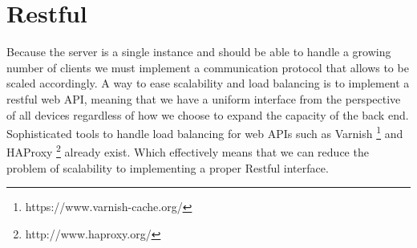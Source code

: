 
\section{Restful}
Because the server is a single instance and should be able to handle a growing number of clients we must implement a communication protocol that allows to be scaled accordingly. A way to ease scalability and load balancing is to implement a restful web API, meaning that we have a uniform interface from the perspective of all devices regardless of how we choose to expand the capacity of the back end. Sophisticated tools to handle load balancing for web APIs such as Varnish \footnote{https://www.varnish-cache.org/} and HAProxy \footnote{http://www.haproxy.org/} already exist. Which effectively means that we can reduce the problem of scalability to implementing a proper Restful interface. 


